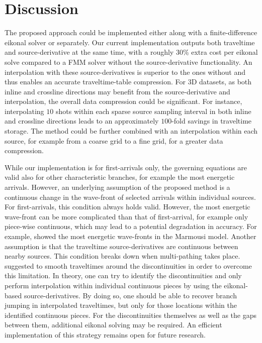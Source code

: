 \section{Discussion}

The proposed approach could be implemented either along with a finite-difference eikonal solver or 
separately. Our current implementation outputs both traveltime and source-derivative at the same time, 
with a roughly 30\% extra cost per eikonal solve compared to a FMM solver without the source-derivative 
functionality. An interpolation with these source-derivatives is superior to the ones without and thus 
enables an accurate traveltime-table compression. For 3D datasets, as both inline and crossline 
directions may benefit from the source-derivative and interpolation, the overall data compression could 
be significant. For instance, interpolating $10$ shots within each sparse source sampling interval in 
both inline and crossline directions leads to an approximately $100$-fold savings in traveltime storage. 
The method could be further combined with an interpolation within each source, for example from a coarse 
grid to a fine grid, for a greater data compression.

While our implementation is for first-arrivals only, the governing equations are valid also for other 
characteristic branches, for example the most energetic arrivals. However, an underlying assumption 
of the proposed method is a continuous change in the wave-front of selected arrivals within individual 
sources. For first-arrivals, this condition always holds valid. However, the most energetic wave-front 
can be more complicated than that of first-arrival, for example only piece-wise continuous, which may 
lead to a potential degradation in accuracy. For example, \cite{nichols} showed the most energetic 
wave-fronts in the Marmousi model. Another assumption is that the traveltime source-derivatives are 
continuous between nearby sources. This condition breaks down when multi-pathing takes place. \cite{vanelle} 
suggested to smooth traveltimes around the discontinuities in order to overcome this limitation. In theory, 
one can try to identify the discontinuities and only perform interpolation within individual continuous 
pieces by using the eikonal-based source-derivatives. By doing so, one should be able to recover branch 
jumping in interpolated traveltimes, but only for those locations within the identified continuous pieces. 
For the discontinuities themselves as well as the gaps between them, additional eikonal solving may be 
required. An efficient implementation of this strategy remains open for future research.

